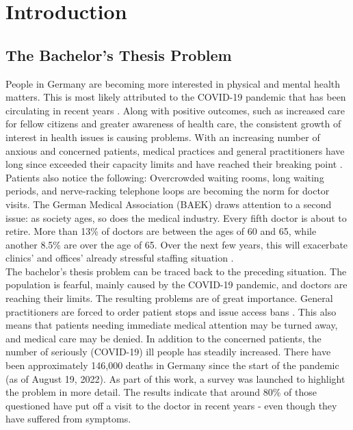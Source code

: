 
\chapter{Introduction}

\section{The Bachelor's Thesis Problem}
People in Germany are becoming more interested in physical and mental health matters. This is most likely attributed to the COVID-19 pandemic that has been circulating in recent years \cite{.bahn-bonn}. Along with positive outcomes, such as increased care for fellow citizens and greater awareness of health care, the consistent growth of interest in health issues is causing problems. With an increasing number of anxious and concerned patients, medical practices and general practitioners have long since exceeded their capacity limits and have reached their breaking point \cite{.sok}. Patients also notice the following: Overcrowded waiting rooms, long waiting periods, and nerve-racking telephone loops are becoming the norm for doctor visits. The German Medical Association (BAEK) draws attention to a second issue: as society ages, so does the medical industry. Every fifth doctor is about to retire. More than 13\% of doctors are between the ages of 60 and 65, while another 8.5\% are over the age of 65. Over the next few years, this will exacerbate clinics' and offices' already stressful staffing situation \cite{.blatt}. 
\newline \\
The bachelor's thesis problem can be traced back to the preceding situation. The population is fearful, mainly caused by the COVID-19 pandemic, and doctors are reaching their limits. The resulting problems are of great importance. General practitioners are forced to order patient stops and issue access bans \cite{.sok}. This also means that patients needing immediate medical attention may be turned away, and medical care may be denied. In addition to the concerned patients, the number of seriously (COVID-19) ill people has steadily increased. There have been approximately 146,000 deaths in Germany since the start of the pandemic (as of August 19, 2022)\cite{.rki}. As part of this work, a survey was launched to highlight the problem in more detail. The results indicate that around 80\% of those questioned have put off a visit to the doctor in recent years - even though they have suffered from symptoms.
